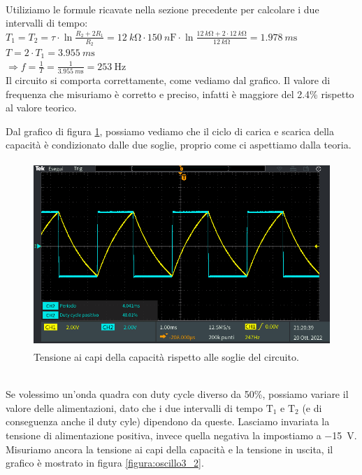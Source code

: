 \documentclass{report}
\begin{document}
\\Utiliziamo le formule ricavate nella sezione precedente per calcolare i due intervalli di tempo:
\\[4pt]\indent$\displaystyle{T_1=T_2=\tau\cdot\ln\frac{R_2+2R_1}{R_2}=\SI{12}{k\ohm}\cdot\SI{150}{n\farad}\cdot\ln\frac{\SI{12}{k\ohm}+2\cdot\SI{12}{k\ohm}}{\SI{12}{k\ohm}}=\SI{1.978}{m\second}}$
\\[4pt]\indent$\displaystyle{T=2\cdot T_1 = \SI{3.955}{m\second}}$
\\[4pt]\indent$\Rightarrow\displaystyle{f=\frac{1}{T}=\frac{1}{\SI{3.955}{m\second}}=\SI{253}{\hertz}}$
\\[4pt]Il circuito si comporta correttamente, come vediamo dal grafico. Il valore di frequenza che misuriamo è corretto e preciso, infatti è maggiore del 2.4\% rispetto al valore teorico.\par
Dal grafico di figura \ref{figura:soglieCap}, possiamo vediamo che il ciclo di carica e scarica della capacità è condizionato dalle due soglie, proprio come ci aspettiamo dalla teoria.
\begin{figure}[h!]
	\centering
	\includegraphics[height=7cm]{immagini/TEK00026}
	\caption{Tensione ai capi della capacità rispetto alle soglie del circuito.}
	\label{figura:soglieCap}
\end{figure}
\\Se volessimo un'onda quadra con duty cycle diverso da 50\%, possiamo variare il valore delle alimentazioni, dato che i due intervalli di tempo $\mathrm{T_1}$ e $\mathrm{T_2}$ (e di conseguenza anche il duty cyle) dipendono da queste. Lasciamo invariata la tensione di alimentazione positiva, invece quella negativa la impostiamo a \SI{-15}{\volt}. Misuriamo ancora la tensione ai capi della capacità e la tensione in uscita, il grafico è mostrato in figura \ref{figura:oscillo3_2}.
\end{document}
